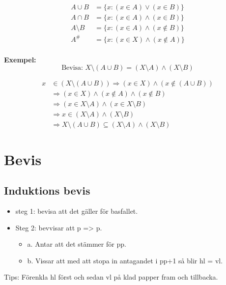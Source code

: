 \begin{multicols}{2}
\begin{align*}
  A \cup B &= \{ x:(x \in A) \lor (x \in B)\} \\
  A \cap B &= \{ x:(x \in A) \land (x \in B)\} \\
  A \setminus B &= \{ x:(x \in A) \land (x \notin B)\} \\
  A^{\text{\#}} &= \{ x:(x \in X) \land (x \notin A)\} \\
\end{align*}

\textbf{Exempel:}
\begin{equation*}
  \text{Bevisa: } X \setminus (A \cup B) = (X \setminus A) \land (X \setminus B) 
\end{equation*}

\begin{align*}
  x &\in (X \setminus (A \cup B)) \Rightarrow (x \in X) \land (x \notin (A \cup B)) \\
  &\Rightarrow (x \in X) \land (x \notin A) \land (x \notin B) \\
  &\Rightarrow (x \in X \setminus A) \land (x \in X \setminus B) \\
  &\Rightarrow x \in (X \setminus A) \land (X \setminus B) \\
  &\Rightarrow X \setminus (A \cup B) \subseteq (X \setminus A) \land (X \setminus B)
\end{align*}


\section{Bevis}
\subsection{Induktions bevis}
\begin{itemize}
  \item steg 1: bevisa att det gäller för basfallet.
  \item Steg 2: bevvisar att p => p.
  \begin{itemize}
    \item a. Antar att det stämmer för pp.
    \item b. Vissar att med att stopa in antagandet i pp+1 så blir hl = vl.
  \end{itemize}
\end{itemize}
Tips: Förenkla hl först och sedan vl på klad papper fram och tillbacka. \newline


\end{multicols}

